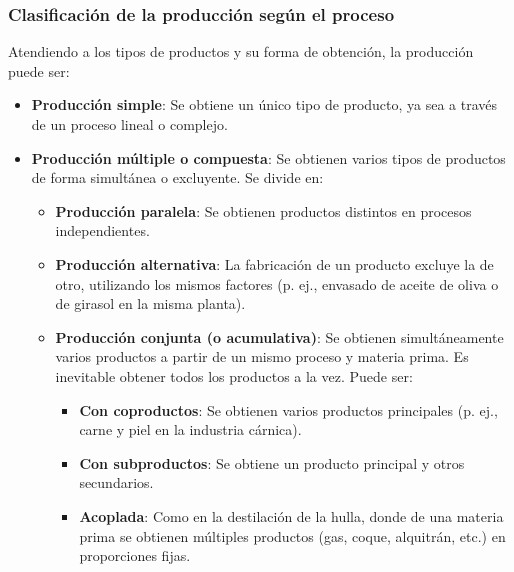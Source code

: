 \subsubsection{Clasificación de la producción según el proceso}
Atendiendo a los tipos de productos y su forma de obtención, la producción puede ser:
\begin{itemize}
    \item \textbf{Producción simple}: Se obtiene un único tipo de producto, ya sea a través de un proceso lineal o complejo.
    \item \textbf{Producción múltiple o compuesta}: Se obtienen varios tipos de productos de forma simultánea o excluyente. Se divide en:
        \begin{itemize}
            \item \textbf{Producción paralela}: Se obtienen productos distintos en procesos independientes.
            \item \textbf{Producción alternativa}: La fabricación de un producto excluye la de otro, utilizando los mismos factores (p. ej., envasado de aceite de oliva o de girasol en la misma planta).
            \item \textbf{Producción conjunta (o acumulativa)}: Se obtienen simultáneamente varios productos a partir de un mismo proceso y materia prima. Es inevitable obtener todos los productos a la vez. Puede ser:
                \begin{itemize}
                    \item \textbf{Con coproductos}: Se obtienen varios productos principales (p. ej., carne y piel en la industria cárnica).
                    \item \textbf{Con subproductos}: Se obtiene un producto principal y otros secundarios.
                    \item \textbf{Acoplada}: Como en la destilación de la hulla, donde de una materia prima se obtienen múltiples productos (gas, coque, alquitrán, etc.) en proporciones fijas.
                \end{itemize}
        \end{itemize}
\end{itemize}

